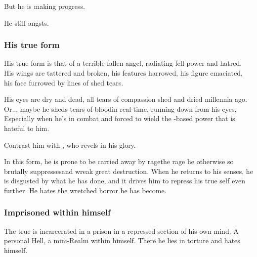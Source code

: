 But he is making progress.


He still angsts.






\subsubsection{His true form}
His true form is that of a terrible fallen angel, radiating fell power and hatred. His wings are tattered and broken, his features harrowed, his figure emaciated, his face furrowed by lines of shed tears. 

His eyes are dry and dead, all tears of compassion shed and dried millennia ago. Or... maybe he sheds tears of blood\dash in real-time, running down from his eyes. Especially when he's in combat and forced to wield the \nieur-based power that is hateful to him.

Contrast him with , who revels in his \resphan{} glory.

In this form, he is prone to be carried away by rage\dash the rage he otherwise so brutally suppresses\dash and wreak great destruction. When he returns to his senses, he is disgusted by what he has done, and it drives him to repress his true self even further. He hates the wretched horror he has become. 





\subsubsection{Imprisoned within himself}
The true \Sithiyacaan{} is incarcerated in a prison in a repressed section of his own mind. A personal Hell, a mini-Realm within himself. There he lies in torture and hates himself. 

